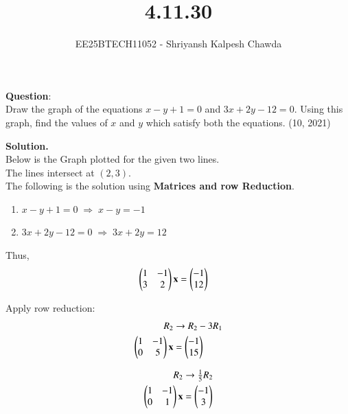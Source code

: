 \documentclass[journal]{IEEEtran}
\begin{document}
	
	
	\vspace{3cm}
	
	\title{4.11.30}
	\author{EE25BTECH11052 - Shriyansh Kalpesh Chawda}
	{\let\newpage\relax\maketitle}
	
	
	\renewcommand{\thefigure}{\arabic{figure}}
	\renewcommand{\thetable}{\arabic{table}}
	\setcounter{section}{0}          
	\renewcommand{\theequation}{\arabic{equation}}
	
	\textbf{Question}:\\
	Draw the graph of the equations $x - y + 1 = 0$ and $3x + 2y - 12 = 0$. Using this graph, find the values of $x$ and $y$ which satisfy both the equations. 
	\hfill (10, 2021)
	
	\textbf{Solution.}\\
	Below is the Graph plotted for the given two lines. \\
	The lines intersect at $(2,3)$.\\
	The following is the solution using \textbf{Matrices and row Reduction}.\\
	\begin{enumerate}[label=(\roman*)]
		\item $x - y + 1 = 0 \;\Longrightarrow\; x - y = -1$
		\item $3x + 2y - 12 = 0 \;\Longrightarrow\; 3x + 2y = 12$
	\end{enumerate}
	
	Thus,
	\begin{align}
		\begin{pmatrix}1 & -1 \\ 3 & 2\end{pmatrix}\mathbf{x} &= \begin{pmatrix}-1 \\ 12\end{pmatrix}
	\end{align}
	
	Apply row reduction:
	\begin{align}
		R_2 &\to R_2 - 3R_1 \\
		\begin{pmatrix}1 & -1 \\ 0 & 5\end{pmatrix}\mathbf{x} &= \begin{pmatrix}-1 \\ 15\end{pmatrix}
	\end{align}
	
	\begin{align}
	R_2 &\to \tfrac{1}{5}R_2 \\
		\begin{pmatrix}1 & -1 \\ 0 & 1\end{pmatrix}\mathbf{x} &= \begin{pmatrix}-1 \\ 3\end{pmatrix}
	\end{align}
	
\end{document}
